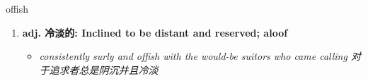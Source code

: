 
\begin{frame}
{\huge offish}
\begin{center}
\begin{enumerate}\Large
  \item \textbf{adj. 冷淡的: Inclined to be distant and reserved; aloof}
  \begin{itemize}
    \item \em{\Large{consistently surly and offish with the would-be suitors who came calling 对于追求者总是阴沉并且冷淡}}
  \end{itemize}
\end{enumerate}
\end{center}
\end{frame}
